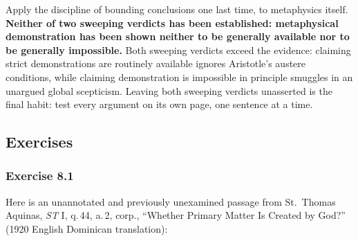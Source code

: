 Apply the discipline of bounding conclusions one last time, to metaphysics itself. \textbf{Neither of two sweeping verdicts has been established: metaphysical demonstration has been shown neither to be generally available nor to be generally impossible.} Both sweeping verdicts exceed the evidence: claiming strict demonstrations are routinely available ignores Aristotle's austere conditions, while claiming demonstration is impossible in principle smuggles in an unargued global scepticism. Leaving both sweeping verdicts unasserted is the final habit: test every argument on its own page, one sentence at a time.

\subsection{Exercises}

\subsubsection*{Exercise 8.1}
Here is an unannotated and previously unexamined passage from St.\ Thomas Aquinas, \emph{ST} I, q.\,44, a.\,2, corp., ``Whether Primary Matter Is Created by God?'' (1920 English Dominican translation):

